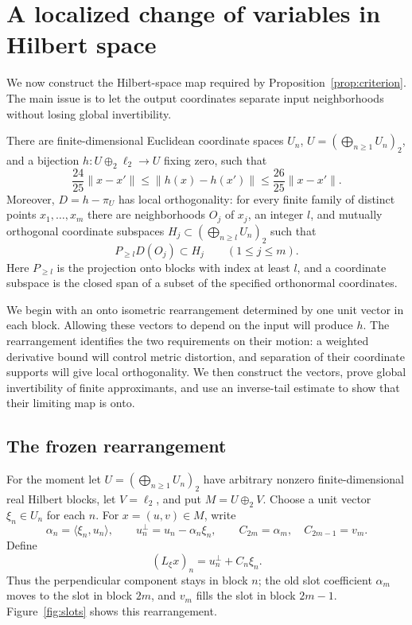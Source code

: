 \section{A localized change of variables in Hilbert space}
\label{sec:hilbert}

We now construct the Hilbert-space map required by
Proposition~\ref{prop:criterion}. The main issue is to let the output
coordinates separate input neighborhoods without losing global
invertibility.

\begin{theorem}
\label{thm:hilbert-map}
There are finite-dimensional Euclidean coordinate spaces $U_n$,
$U=(\bigoplus_{n\ge1}U_n)_2$, and a bijection
$h:U\oplus_2\ell_2\to U$ fixing zero, such that
\begin{equation}
\label{eq:h-bounds}
 \frac{24}{25}\|x-x'\|
 \le\|h(x)-h(x')\|
 \le\frac{26}{25}\|x-x'\|.
\end{equation}
Moreover, $D=h-\pi_U$ has local orthogonality: for every finite family
of distinct points $x_1,\ldots,x_m$ there are neighborhoods $O_j$ of
$x_j$, an integer $l$, and mutually orthogonal coordinate subspaces
$H_j\subset(\bigoplus_{n\ge l}U_n)_2$ such that
\[
 P_{\ge l}D(O_j)\subset H_j\qquad(1\le j\le m).
\]
Here $P_{\ge l}$ is the projection onto blocks with index at least
$l$, and a coordinate subspace is the closed span of a subset of the
specified orthonormal coordinates.
\end{theorem}

We begin with an onto isometric rearrangement determined by one unit
vector in each block. Allowing these vectors to depend on the input
will produce $h$. The rearrangement identifies the two requirements
on their motion: a weighted derivative bound will control metric
distortion, and separation of their coordinate supports will give
local orthogonality. We then construct the vectors, prove global
invertibility of finite approximants, and use an inverse-tail
estimate to show that their limiting map is onto.

\subsection{The frozen rearrangement}

For the moment let \(U=(\bigoplus_{n\ge1}U_n)_2\) have arbitrary
nonzero finite-dimensional real Hilbert blocks, let \(V=\ell_2\),
and put \(M=U\oplus_2V\). Choose a unit vector \(\xi_n\in U_n\)
for each \(n\). For \(x=(u,v)\in M\), write
\[
 \alpha_n=\langle \xi_n,u_n\rangle,\qquad
 u_n^\perp=u_n-\alpha_n\xi_n,\qquad
 C_{2m}=\alpha_m,\quad C_{2m-1}=v_m.
\]
Define
\begin{equation}
\label{eq:frozen-map}
 (L_\xi x)_n=u_n^\perp+C_n\xi_n.
\end{equation}
Thus the perpendicular component stays in block \(n\); the old slot
coefficient \(\alpha_m\) moves to the slot in block \(2m\), and
\(v_m\) fills the slot in block \(2m-1\). Figure~\ref{fig:slots}
shows this rearrangement.

